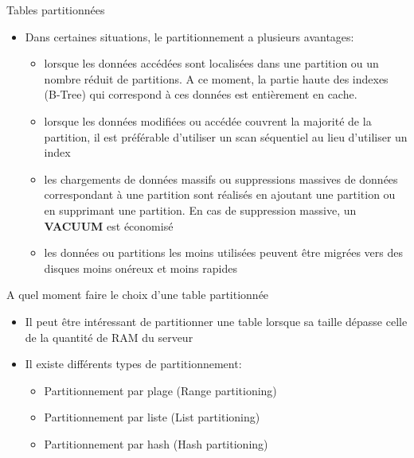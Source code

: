 \begin{frame}[fragile]{Tables partitionnées}

   \begin{itemize}
      \item Dans certaines situations, le partitionnement a plusieurs avantages:
      \begin{itemize}
         \item lorsque les données accédées sont localisées dans une partition ou un nombre réduit de partitions. A ce moment, la partie haute des indexes (B-Tree) qui correspond à ces données est entièrement en cache.
         \item lorsque les données modifiées ou accédée couvrent la majorité de la partition, il est préférable d'utiliser un scan séquentiel au lieu d'utiliser un index
         \item les chargements de données massifs ou suppressions massives de données correspondant à une partition sont réalisés en ajoutant une partition ou en supprimant une partition. En cas de suppression massive, un \textbf{VACUUM} est économisé
         \item les données ou partitions les moins utilisées peuvent être migrées vers des disques moins onéreux et moins rapides
      \end{itemize}

   \end{itemize}

\end{frame}


\begin{frame}[fragile]{A quel moment faire le choix d'une table partitionnée}

   \begin{itemize}
      \item Il peut être intéressant de partitionner une table lorsque sa taille dépasse celle de la quantité de RAM du serveur
      \item Il existe différents types de partitionnement:
      \begin{itemize}
         \item Partitionnement par plage (Range partitioning)
         \item Partitionnement par liste (List partitioning)
         \item Partitionnement par hash (Hash partitioning)
      \end{itemize}

   \end{itemize}

\end{frame}

